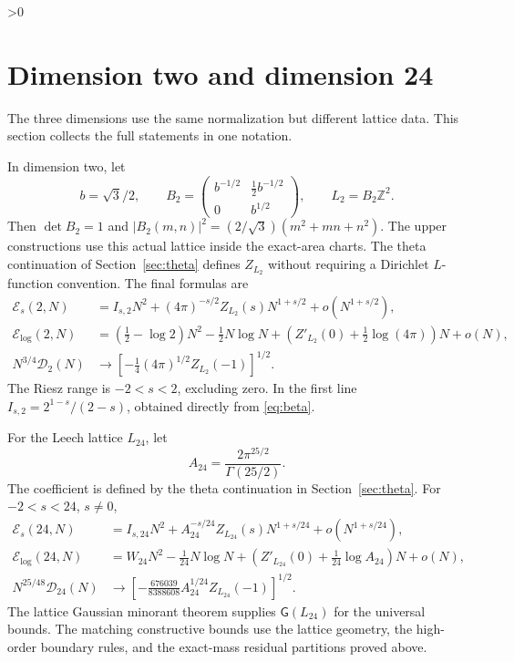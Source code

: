 \documentclass[11pt,a4paper]{article}
\theoremstyle{definition}
\newcommand{\Z}{\mathbb Z}
\newcommand{\cE}{\mathcal E}
\newcommand{\cD}{\mathcal D}
\newcommand{\abs}[1]{\lvert#1\rvert}
\newcommand{\G}{\mathsf G}
\numberwithin{equation}{section}
\let\originalsection\section
\renewcommand{\section}{\ifnum\value{section}>0\clearpage\fi\originalsection}
\begin{document}
\section{Dimension two and dimension 24}\label{sec:otherdims}
The three dimensions use the same normalization but different lattice data. This section collects the full statements in one notation.

In dimension two, let
\begin{equation}
 b=\sqrt3/2,\qquad
 B_2=\begin{pmatrix}b^{-1/2}&\tfrac12b^{-1/2}\\0&b^{1/2}\end{pmatrix},
 \qquad L_2=B_2\Z^2.
\end{equation}
Then $\det B_2=1$ and
$\abs{B_2(m,n)}^2=(2/\sqrt3)(m^2+mn+n^2)$. The upper constructions use this actual lattice inside the exact-area charts. The theta continuation of Section~\ref{sec:theta} defines $Z_{L_2}$ without requiring a Dirichlet $L$-function convention. The final formulas are
\begin{align}
 \cE_s(2,N)&=I_{s,2}N^2+(4\pi)^{-s/2}Z_{L_2}(s)N^{1+s/2}
                   +o(N^{1+s/2}),\\
 \cE_{\log}(2,N)&=\left(\tfrac12-\log2\right)N^2
       -\tfrac12N\log N+
       \left(Z'_{L_2}(0)+\tfrac12\log(4\pi)\right)N+o(N),\\
 N^{3/4}\cD_2(N)&\longrightarrow
       \left[-\tfrac14(4\pi)^{1/2}Z_{L_2}(-1)\right]^{1/2}.
\end{align}
The Riesz range is $-2<s<2$, excluding zero. In the first line $I_{s,2}=2^{1-s}/(2-s)$, obtained directly from \eqref{eq:beta}.

For the Leech lattice $L_{24}$, let
\begin{equation}
 A_{24}=\frac{2\pi^{25/2}}{\Gamma(25/2)}.
\end{equation}
The coefficient is defined by the theta continuation in Section~\ref{sec:theta}. For $-2<s<24$, $s\ne0$,
\begin{align}
 \cE_s(24,N)&=I_{s,24}N^2+
        A_{24}^{-s/24}Z_{L_{24}}(s)N^{1+s/24}+o(N^{1+s/24}),\\
 \cE_{\log}(24,N)&=W_{24}N^2-\tfrac1{24}N\log N+
     \left(Z'_{L_{24}}(0)+\tfrac1{24}\log A_{24}\right)N+o(N),\\
 N^{25/48}\cD_{24}(N)&\longrightarrow
 \left[-\frac{676039}{8388608}A_{24}^{1/24}Z_{L_{24}}(-1)\right]^{1/2}.
\end{align}
The lattice Gaussian minorant theorem supplies $\G(L_{24})$ for the universal bounds. The matching constructive bounds use the lattice geometry, the high-order boundary rules, and the exact-mass residual partitions proved above.
\end{document}
